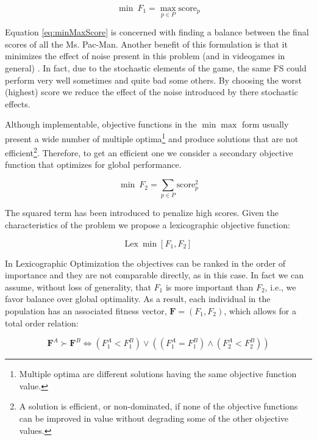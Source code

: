 \documentclass[journal]{IEEEtran}
\begin{document}
\begin{equation}
\label{eq:minMaxScore}
	\min \: F_1 = \max_{p \in P} \text{score}_p
\end{equation}

Equation \eqref{eq:minMaxScore} is concerned with finding a balance between the final scores of all the Ms. Pac-Man. Another benefit of this formulation is that it minimizes the effect of noise present in this problem (and in videogames in general) \cite{Mora12}. In fact, due to the stochastic elements of the game, the same FS could perform very well sometimes and quite bad some others. By choosing the worst (highest) score we reduce the effect of the noise introduced by there stochastic effects.

Although implementable, objective functions in the $\min \max$ form usually present a wide number of multiple optima\footnote{Multiple optima are different solutions having the same objective function value.} and produce solutions that are not efficient\footnote{A solution is efficient, or non-dominated, if none of the objective functions can be improved in value without degrading some of the other objective values.}. Therefore, to get an efficient one we consider a secondary objective function that optimizes for global performance.

\begin{equation}
\label{eq:minSquareScore}
	\min \: F_2 = \sum_{p \in P} \text{score}_p^2
\end{equation}

The squared term has been introduced to penalize high scores. Given the characteristics of the problem we propose a lexicographic objective function:

\begin{equation}
\label{eq:lexicographic}
	\text{Lex} \: \min [F_1,F_2]
\end{equation}

In Lexicographic Optimization \cite{Dylan2010} the objectives can be ranked in the order of importance and they are not comparable directly, as in this case. In fact we can assume, without loss of generality, that $F_1$ is more important than $F_2$, i.e., we favor balance over global optimality. As a result, each individual in the population has an associated fitness vector, $\mathbf{F}=(F_1,F_2)$, which allows for a total order relation:

\begin{equation}
\label{eq:ordering}
	\mathbf{F}^A \succ \mathbf{F}^B \iff (F_1^A < F_1^B) \lor ((F_1^A = F_1^B) \land (F_2^A < F_2^B))
\end{equation}
\end{document}
